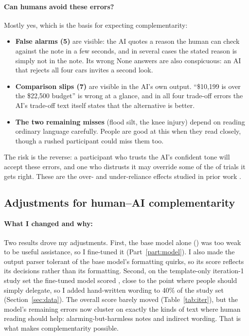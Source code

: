\documentclass[11pt]{article}
\begin{document}
\paragraph{Can humans avoid these errors?} Mostly yes, which is the basis for expecting
complementarity:
\begin{itemize}
  \item \textbf{False alarms (5)} are visible: the AI quotes a reason the human can check against the
  note in a few seconds, and in several cases the stated reason is simply not in the note. Its
  wrong None answers are also conspicuous: an AI that rejects all four cars invites a second look.
  \item \textbf{Comparison slips (7)} are visible in the AI's own output. ``\$10,199 is over the
  \$22,500 budget'' is wrong at a glance, and in all four trade-off errors the AI's trade-off text
  itself states that the alternative is better.
  \item \textbf{The two remaining misses} (flood silt, the knee injury) depend on reading ordinary
  language carefully. People are good at this when they read closely, though a rushed participant
  could miss them too.
\end{itemize}
The risk is the reverse: a participant who trusts the AI's confident tone will accept these
errors, and one who distrusts it may override some of the \FtAcc{} of trials it gets right. These
are the over- and under-reliance effects studied in prior work \cite{bansal, bucinca}.

\subsection{Adjustments for human--AI complementarity}\label{sec:adjust}

\begin{table}[htbp]
\centering
\caption{Acceptable-choice rate across study-set iterations (same trials and answer key; only the
wording of 80 trials differs). Higher is better.}
\label{tab:iter}

\end{table}

\paragraph{What I changed and why:} Two results drove my adjustments. First, the base model alone
(\BaseAcc{}) was too weak to be useful assistance, so I fine-tuned it (Part~\ref{part:model}). I
also made the output parser tolerant of the base model's formatting quirks, so its score reflects
its decisions rather than its formatting. Second, on the template-only iteration-1 study set the
fine-tuned model scored \FtAccOne{}, close to the point where people should simply delegate, so I
added hand-written wording to 40\% of the study set (Section~\ref{sec:data}). The overall score
barely moved (Table~\ref{tab:iter}), but the model's remaining errors now cluster on exactly the
kinds of text where human reading should help: alarming-but-harmless notes and indirect wording.
That is what makes complementarity possible.
\end{document}
